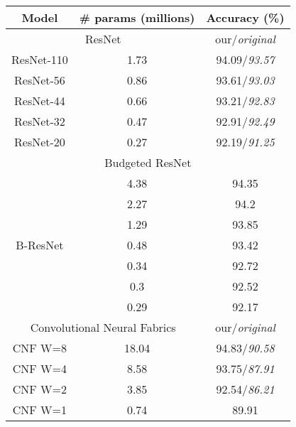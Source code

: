 \begin{table}[h!]
\centering
\begin{tabular}{|c||cc|}
\hline
Model                       & \# params (millions) & Accuracy (\%) \\ \hline \hline
\multicolumn{2}{|c|}{ResNet \cite{DBLP:journals/corr/HeZRS15}}                       & our/\textit{original}  \\ \hline
ResNet-110                   & 1.73           & 94.09/\textit{93.57}   \\
ResNet-56                    & 0.86          & 93.61/\textit{93.03}   \\
ResNet-44                    & 0.66                 		& 93.21/\textit{92.83}   \\
ResNet-32                    & 0.47           & 92.91/\textit{92.49}   \\
ResNet-20                    & 0.27                 		& 92.19/\textit{91.25}   \\ \hline \hline
\multicolumn{3}{|c|}{Budgeted ResNet}                              \\ \hline
\multirow{7}{*}{B-ResNet}   & 4.38                 & 94.35         \\
                            & 2.27                 & 94.2          \\
                            & 1.29                 & 93.85         \\
                            & 0.48                 & 93.42         \\
                            & 0.34                 & 92.72         \\
                            & 0.3                  & 92.52         \\
                            & 0.29                 & 92.17         \\ \hline \hline
\multicolumn{2}{|c|}{Convolutional Neural Fabrics \cite{DBLP:journals/corr/SaxenaV16}} & our/\textit{original}  \\ \hline
CNF W=8                     & 18.04           & 94.83/\textit{90.58}   \\
CNF W=4                     & 8.58              & 93.75/\textit{87.91}   \\
CNF W=2                     & 3.85              & 92.54/\textit{86.21}   \\
CNF W=1                     & 0.74                 & 89.91         \\ \hline \hline

\end{tabular}
\end{table}
